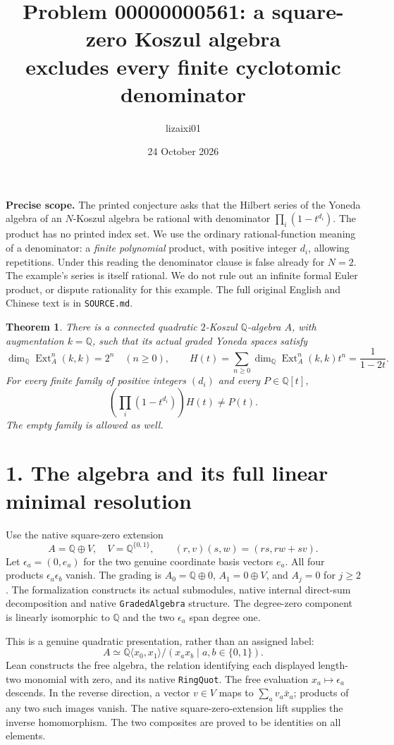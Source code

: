 \documentclass[10pt]{article}
\title{Problem 00000000561: a square-zero Koszul algebra\protect\\ excludes every finite cyclotomic denominator}
\author{lizaixi01}
\date{24 October 2026}
\newtheorem{theorem}{Theorem}
\newcommand{\Q}{\mathbb Q}
\newcommand{\Ext}{\operatorname{Ext}}
\begin{document}
\maketitle
\vspace{-1.8em}

\textbf{Precise scope.}
The printed conjecture asks that the Hilbert series of the Yoneda algebra of an
$N$-Koszul algebra be rational with denominator $\prod_i(1-t^{d_i})$.
The product has no printed index set. We use the ordinary rational-function
meaning of a denominator: a \emph{finite polynomial} product, with positive
integer $d_i$, allowing repetitions. Under this reading the denominator clause
is false already for $N=2$. The example's series is itself rational.
We do not rule out an infinite formal Euler product, or dispute rationality for
this example. The full original English and Chinese text is in \texttt{SOURCE.md}.

\begin{theorem}
There is a connected quadratic $2$-Koszul $\Q$-algebra $A$, with augmentation
$k=\Q$, such that its actual graded Yoneda spaces satisfy
\[
 \dim_\Q\Ext_A^n(k,k)=2^n\quad(n\geq0),\qquad
 H(t)=\sum_{n\geq0}\dim_\Q\Ext_A^n(k,k)t^n=\frac1{1-2t}.
\]
For every finite family of positive integers $(d_i)$ and every $P\in\Q[t]$,
\[
 \left(\prod_i(1-t^{d_i})\right)H(t)\ne P(t).
\]
The empty family is allowed as well.
\end{theorem}

\section*{1. The algebra and its full linear minimal resolution}
Use the native square-zero extension
\[
 A=\Q\oplus V,\quad V=\Q^{\{0,1\}},\qquad
 (r,v)(s,w)=(rs,rw+sv).
\]
Let $\epsilon_a=(0,e_a)$ for the two genuine coordinate basis vectors $e_a$.
All four products $\epsilon_a\epsilon_b$ vanish. The grading is
$A_0=\Q\oplus0$, $A_1=0\oplus V$, and $A_j=0$ for $j\geq2$.
The formalization constructs its actual submodules, native internal direct-sum
decomposition and native \texttt{GradedAlgebra} structure. The degree-zero
component is linearly isomorphic to $\Q$ and the two $\epsilon_a$ span degree one.

This is a genuine quadratic presentation, rather than an assigned label:
\[
 A\simeq \Q\langle x_0,x_1\rangle/(x_ax_b\mid a,b\in\{0,1\}).
\]
Lean constructs the free algebra, the relation identifying each displayed
length-two monomial with zero, and its native \texttt{RingQuot}. The free
evaluation $x_a\mapsto\epsilon_a$ descends. In the reverse direction, a vector
$v\in V$ maps to $\sum_a v_a\bar x_a$; products of any two such images vanish.
The native square-zero-extension lift supplies the inverse homomorphism.
The two composites are proved to be identities on all elements.
\end{document}
